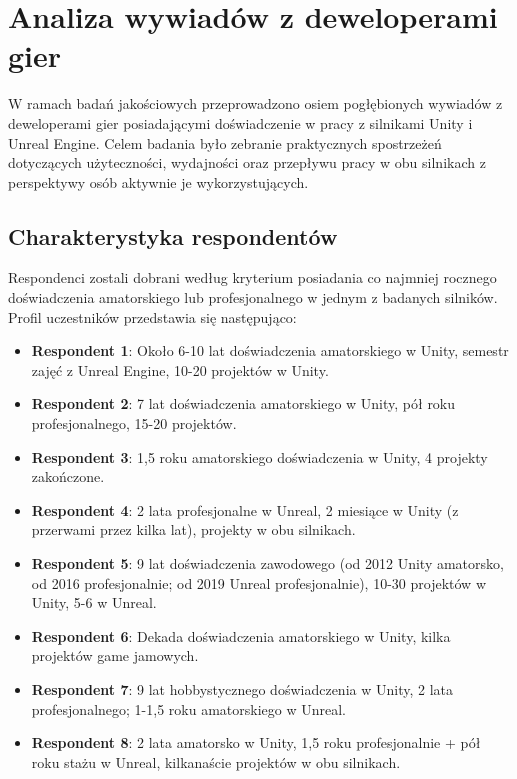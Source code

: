 \clearpage
\section{Analiza wywiadów z deweloperami gier}
\label{sec:wywiady}

W ramach badań jakościowych przeprowadzono osiem pogłębionych wywiadów z deweloperami gier posiadającymi doświadczenie w pracy z silnikami Unity i Unreal Engine. Celem badania było zebranie praktycznych spostrzeżeń dotyczących użyteczności, wydajności oraz przepływu pracy w obu silnikach z perspektywy osób aktywnie je wykorzystujących.

\subsection{Charakterystyka respondentów}
\label{subsec:charakterystyka-respondentow}

Respondenci zostali dobrani według kryterium posiadania co najmniej rocznego doświadczenia amatorskiego lub profesjonalnego w jednym z badanych silników. Profil uczestników przedstawia się następująco:

\begin{itemize}
    \item \textbf{Respondent 1}: Około 6-10 lat doświadczenia amatorskiego w Unity, semestr zajęć z Unreal Engine, 10-20 projektów w Unity.
    \item \textbf{Respondent 2}: 7 lat doświadczenia amatorskiego w Unity, pół roku profesjonalnego, 15-20 projektów.
    \item \textbf{Respondent 3}: 1,5 roku amatorskiego doświadczenia w Unity, 4 projekty zakończone.
    \item \textbf{Respondent 4}: 2 lata profesjonalne w Unreal, 2 miesiące w Unity (z przerwami przez kilka lat), projekty w obu silnikach.
    \item \textbf{Respondent 5}: 9 lat doświadczenia zawodowego (od 2012 Unity amatorsko, od 2016 profesjonalnie; od 2019 Unreal profesjonalnie), 10-30 projektów w Unity, 5-6 w Unreal.
    \item \textbf{Respondent 6}: Dekada doświadczenia amatorskiego w Unity, kilka projektów game jamowych.
    \item \textbf{Respondent 7}: 9 lat hobbystycznego doświadczenia w Unity, 2 lata profesjonalnego; 1-1,5 roku amatorskiego w Unreal.
    \item \textbf{Respondent 8}: 2 lata amatorsko w Unity, 1,5 roku profesjonalnie + pół roku stażu w Unreal, kilkanaście projektów w obu silnikach.
\end{itemize}


